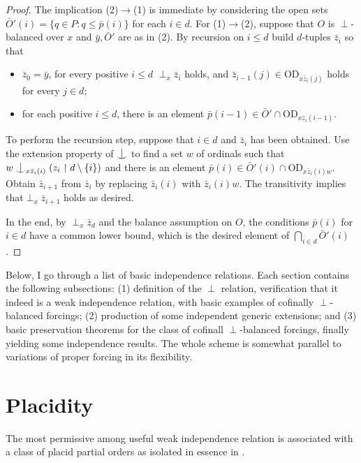 \documentclass{article}
\newcommand{\vd}{\mathrm{OD}}
\newcommand{\forkindep}[1][]{%
  \mathrel{
    \mathop{
      \vcenter{
        \hbox{\oalign{\noalign{\kern-.3ex}\hfil$\vert$\hfil\cr
              \noalign{\kern-.7ex}
              $\smile$\cr\noalign{\kern-.3ex}}}
      }
    }\displaylimits_{#1}
  }
}
\theoremstyle{definition}
\begin{document}
\begin{proof}
The implication (2)$\to$(1) is immediate by considering the open sets $\bar O'(i)=\{q\in P\colon q\leq\bar p(i)\}$ for each $i\in d$. For (1)$\to$(2), suppose that $O$ is $\perp$-balanced over $x$ and $\bar y, \bar O'$ are as in (2). By recursion on $i\leq d$ build $d$-tuples $\bar z_i$ so that 

\begin{itemize}
\item $\bar z_0=\bar y$, for every positive $i\leq d$ $\perp_x\bar z_i$ holds, and $\bar z_{i-1}(j)\in\vd_{x\bar z_{i}(j)}$ holds for every $j\in d$;
\item for each positive $i\leq d$, there is an element $\bar p(i-1)\in \bar O'\cap\vd_{x\bar z_i(i-1)}$.
\end{itemize}

\noindent To perform the recursion step, suppose that $i\in d$ and $\bar z_i$ has been obtained. Use the extension property of $\forkindep$ to find a set $w$ of ordinals such that $w\forkindep[x\bar z_i(i)](z_i\restriction d\setminus\{i\})$ and there is an element $\bar p(i)\in \bar O'(i)\cap \vd_{x\bar z_i(i)w}$. Obtain $\bar z_{i+1}$ from $\bar z_i$ by replacing $\bar z_i(i)$ with $\bar z_i(i)w$. The transitivity implies that$\perp_x\bar z_{i+1}$ holds as desired.

In the end, by $\perp_x\bar z_d$ and the balance assumption on $O$, the conditions $\bar p(i)$ for $i\in d$ have a common lower bound, which is the desired element of $\bigcap_{i\in d}\bar O'(i)$.
\end{proof}

Below, I go through a list of basic independence relations. Each section contains the following subsections: (1) definition of the $\perp$ relation, verification that it indeed is a weak independence relation, with basic examples of cofinally $\perp$-balanced forcings; (2) production of some independent generic extensions; and (3) basic preservation theorems for the class of cofinall $\perp$-balanced forcings, finally yielding some independence results. The whole scheme is somewhat parallel to variations of proper forcing in its flexibility.

\section{Placidity}
\label{0section}

\noindent The most permissive among useful weak independence relation is associated with a class of placid partial orders as isolated in essence in \cite[Section 9.3]{z:geometric}.
\end{document}
